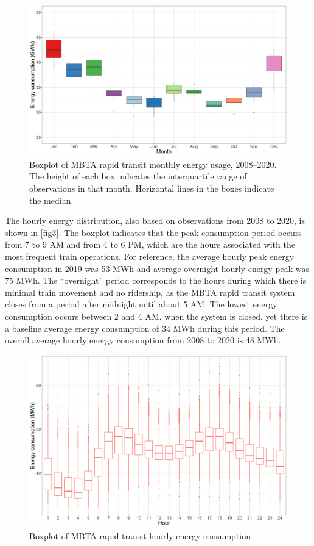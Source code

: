 \documentclass[times]{TRR}
\begin{document}
\begin{figure}[htbp]
    \centering
    \includegraphics[width=.8\textwidth]{Figure_2_Month_box_plot.png}%
    \caption{Boxplot of MBTA rapid transit monthly energy usage, 2008--2020. The height of each box indicates the interquartile range of observations in that month. Horizontal lines in the boxes indicate the median.}
    \label{fig2}
\end{figure}

The hourly energy distribution, also based on observations from 2008 to 2020, is shown in \autoref{fig3}. The boxplot indicates that the peak consumption period occurs from 7 to 9 AM and from 4 to 6 PM, which are the hours associated with the most frequent train operations. For reference, the average hourly peak energy consumption in 2019 was 53 MWh and average overnight hourly energy peak was 75 MWh. The ``overnight'' period corresponds to the hours during which there is minimal train movement and no ridership, as the MBTA rapid transit system closes from a period after midnight until about 5 AM. The lowest energy consumption occurs between 2 and 4 AM, when the system is closed, yet there is a baseline average energy consumption of 34 MWh during this period. The overall average hourly energy consumption from 2008 to 2020 is 48 MWh. 

\begin{figure}[htbp]
    \centering
    \includegraphics[width=.8\textwidth]{Figure_3_Hourly_box_plot.png}
    \caption{Boxplot of MBTA rapid transit hourly energy consumption }
    \label{fig3}
\end{figure}
\end{document}
